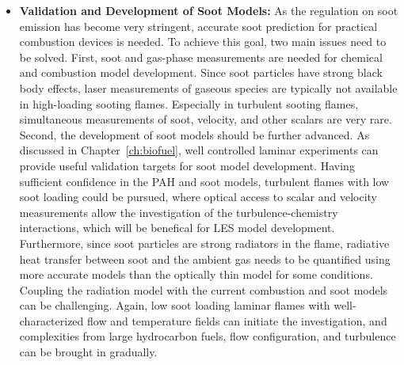 \begin{itemize}
\item \textbf{Validation and Development of Soot Models:} As the regulation on soot emission has become very stringent, accurate soot prediction for practical combustion devices is needed.  To achieve this goal, two main issues need to be solved.  First, soot and gas-phase measurements are needed for chemical and combustion model development.  Since soot particles have strong black body effects, laser measurements of gaseous species are typically not available in high-loading sooting flames.  Especially in turbulent sooting flames, simultaneous measurements of soot, velocity, and other scalars are very rare.  Second, the development of soot models should be further advanced.  As discussed in Chapter~\ref{ch:biofuel}, well controlled laminar experiments can provide useful validation targets for soot model development.  Having sufficient confidence in the PAH and soot models, turbulent flames with low soot loading could be pursued, where optical access to scalar and velocity measurements allow the investigation of the turbulence-chemistry interactions, which will be benefical for LES model development.  Furthermore, since soot particles are strong radiators in the flame, radiative heat transfer between soot and the ambient gas needs to be quantified using more accurate models than the optically thin model for some conditions.  Coupling the radiation model with the current combustion and soot models can be challenging.  Again, low soot loading laminar flames with well-characterized flow and temperature fields can initiate the investigation, and complexities from large hydrocarbon fuels, flow configuration, and turbulence can be brought in gradually. 

\end{itemize}
